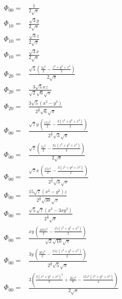 \documentclass[10pt]{article}
\begin{document}
\begin{align*}
\Phi_{00} = &\frac{1}{2 \sqrt{\ensuremath{\pi} }}\\
%
\Phi_{10} = &\frac{\sqrt{3} y}{2 \sqrt{\ensuremath{\pi} }}\\
\Phi_{10} = &\frac{\sqrt{3} z}{2 \sqrt{\ensuremath{\pi} }}\\
\Phi_{10} = &\frac{\sqrt{3} x}{2 \sqrt{\ensuremath{\pi} }}\\
%
\Phi_{20} = &\frac{\sqrt{5} \left( \frac{3 {{z}^{2}}}{2}-\frac{{{z}^{2}}+{{y}^{2}}+{{x}^{2}}}{2}\right) }{2 \sqrt{\ensuremath{\pi} }}\\
\Phi_{20} = &\frac{3 \sqrt{5} x z}{\sqrt{2} \sqrt{6} \sqrt{\ensuremath{\pi} }}\\
\Phi_{20} = &\frac{3 \sqrt{5} \left( {{x}^{2}}-{{y}^{2}}\right) }{{{2}^{\frac{3}{2}}} \sqrt{6} \sqrt{\ensuremath{\pi} }}\\
%
\Phi_{00} = &\frac{\sqrt{7} y\, \left( \frac{15 {{z}^{2}}}{2}-\frac{3 \left( {{z}^{2}}+{{y}^{2}}+{{x}^{2}}\right) }{2}\right) }{{{2}^{\frac{3}{2}}} \sqrt{3} \sqrt{\ensuremath{\pi} }}\\
\Phi_{00} = &\frac{\sqrt{7} \left( \frac{5 {{z}^{3}}}{2}-\frac{3 z\, \left( {{z}^{2}}+{{y}^{2}}+{{x}^{2}}\right) }{2}\right) }{2 \sqrt{\ensuremath{\pi} }}\\
\Phi_{00} = &\frac{\sqrt{7} x\, \left( \frac{15 {{z}^{2}}}{2}-\frac{3 \left( {{z}^{2}}+{{y}^{2}}+{{x}^{2}}\right) }{2}\right) }{{{2}^{\frac{3}{2}}} \sqrt{3} \sqrt{\ensuremath{\pi} }}\\
\Phi_{00} = &\frac{15 \sqrt{7} \left( {{x}^{2}}-{{y}^{2}}\right)  z}{{{2}^{\frac{3}{2}}} \sqrt{30} \sqrt{\ensuremath{\pi} }}\\
\Phi_{00} = &\frac{\sqrt{5} \sqrt{7} \left( {{x}^{3}}-3 x {{y}^{2}}\right) }{{{2}^{\frac{5}{2}}} \sqrt{\ensuremath{\pi} }}\\
%
\Phi_{00} = &\frac{x y\, \left( \frac{105 {{z}^{2}}}{2}-\frac{15 \left( {{z}^{2}}+{{y}^{2}}+{{x}^{2}}\right) }{2}\right) }{\sqrt{2} \sqrt{10} \sqrt{\ensuremath{\pi} }}\\
\Phi_{00} = &\frac{3 y\, \left( \frac{35 {{z}^{3}}}{2}-\frac{15 z\, \left( {{z}^{2}}+{{y}^{2}}+{{x}^{2}}\right) }{2}\right) }{{{2}^{\frac{3}{2}}} \sqrt{5} \sqrt{\ensuremath{\pi} }}\\
\Phi_{00} = &\frac{3 \left( \frac{3 {{\left( {{z}^{2}}+{{y}^{2}}+{{x}^{2}}\right) }^{2}}}{8}+\frac{35 {{z}^{4}}}{8}-\frac{15 {{z}^{2}} \left( {{z}^{2}}+{{y}^{2}}+{{x}^{2}}\right) }{4}\right) }{2 \sqrt{\ensuremath{\pi} }}\\

\end{align*}
\end{document}
